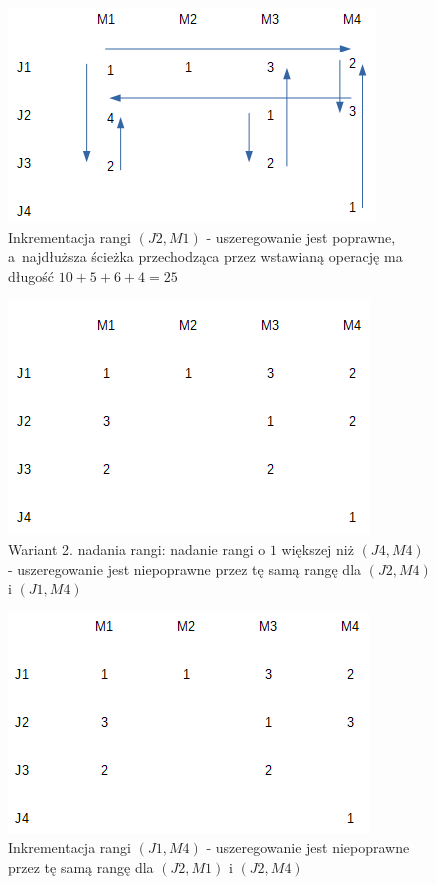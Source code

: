 \documentclass[brudnopis]{xmgr}
\begin{document}
\begin{figure}[!tbh]
\centering
\includegraphics[width=.7\hsize]{fig/2.png}
\caption{Inkrementacja rangi $(J2, M1)$ - uszeregowanie jest poprawne, a~najdłuższa ścieżka przechodząca przez wstawianą operację ma długość $10 + 5 + 6 + 4 = 25$\label{diag:state2}}
\end{figure}\medskip

\begin{figure}[!tbh]
\centering
\includegraphics[width=.7\hsize]{fig/3_0.png}
\caption{Wariant 2. nadania rangi: nadanie rangi o $1$ większej niż $(J4, M4)$ - uszeregowanie jest niepoprawne przez tę samą rangę dla $(J2, M4)$ i $(J1, M4)$\label{diag:state3_0}}
\end{figure}\medskip

\begin{figure}[!tbh]
\centering
\includegraphics[width=.7\hsize]{fig/3_1.png}
\caption{Inkrementacja rangi $(J1, M4)$ - uszeregowanie jest niepoprawne przez tę samą rangę dla $(J2, M1)$ i $(J2, M4)$\label{diag:state3_1}}
\end{figure}\medskip
\end{document}
